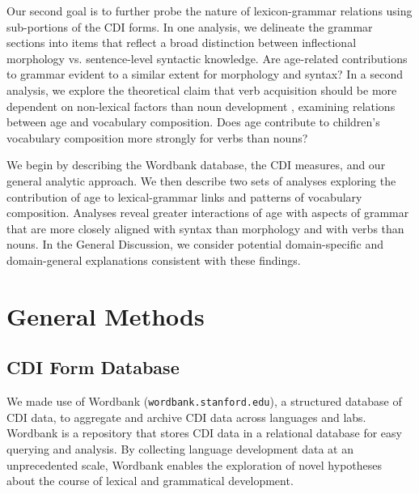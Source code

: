 \documentclass[10pt,letterpaper]{article}
\begin{document}
Our second goal is to further probe the nature of lexicon-grammar relations using sub-portions of the CDI forms. In one analysis, we delineate the grammar sections into items that reflect a broad distinction between inflectional morphology vs. sentence-level syntactic knowledge. Are age-related contributions to grammar evident to a similar extent for morphology and syntax?  In a second analysis, we explore the theoretical claim that verb acquisition should be more dependent on non-lexical factors than noun development \cite{gleitman1990}, examining relations between age and vocabulary composition. Does age contribute to children's vocabulary composition more strongly for verbs than nouns? 



We begin by describing the Wordbank database, the CDI measures, and our general analytic approach. We then describe two sets of analyses exploring the contribution of age to lexical-grammar links and patterns of vocabulary composition.  Analyses reveal greater interactions of age with aspects of grammar that are more closely aligned with syntax than morphology and with verbs than nouns. In the General Discussion, we consider potential domain-specific and domain-general explanations consistent with these findings. 

\section{General Methods}

\subsection{CDI Form Database}

We made use of Wordbank (\texttt{wordbank.stanford.edu}), a structured database of CDI data, to aggregate and archive CDI data across languages and labs. Wordbank is a repository that stores CDI data in a relational database for easy querying and analysis. By collecting language development data at an unprecedented scale, Wordbank enables the exploration of novel hypotheses about the course of lexical and grammatical development. 
\end{document}
